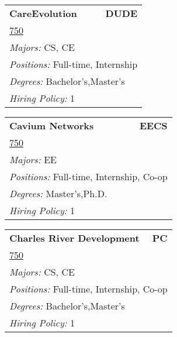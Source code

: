 \documentclass[twoside]{article}
\begin{document}
\begin{center}
\begin{multicols}{3}
\begin{FlushLeft}
\begin{minipage}{.9\columnwidth}
\end{minipage}
 
\begin{minipage}{.9\columnwidth}\begin{tabularx}{.95\columnwidth}{Xr}
                 {\Large\bf CareEvolution} & {\Large\bf DUDE}\\
    \multicolumn{2}{p{.95\columnwidth}}{\url{750}}\\
    \multicolumn{2}{p{.95\columnwidth}}{\emph{Majors:} CS, CE}\\
    \multicolumn{2}{p{.95\columnwidth}}{\emph{Positions:} Full-time, Internship}\\
    \multicolumn{2}{p{.95\columnwidth}}{\emph{Degrees:} Bachelor's,Master's}\\
    \multicolumn{2}{p{.95\columnwidth}}{\emph{Hiring Policy:} 1}\\
    \end{tabularx}
    
\end{minipage}
 
\begin{minipage}{.9\columnwidth}\begin{tabularx}{.95\columnwidth}{Xr}
                 {\Large\bf Cavium Networks} & {\Large\bf EECS}\\
    \multicolumn{2}{p{.95\columnwidth}}{\url{750}}\\
    \multicolumn{2}{p{.95\columnwidth}}{\emph{Majors:} EE}\\
    \multicolumn{2}{p{.95\columnwidth}}{\emph{Positions:} Full-time, Internship, Co-op}\\
    \multicolumn{2}{p{.95\columnwidth}}{\emph{Degrees:} Master's,Ph.D.}\\
    \multicolumn{2}{p{.95\columnwidth}}{\emph{Hiring Policy:} 1}\\
    \end{tabularx}
    
\end{minipage}
 
\begin{minipage}{.9\columnwidth}\begin{tabularx}{.95\columnwidth}{Xr}
                 {\Large\bf Charles River Development} & {\Large\bf PC}\\
    \multicolumn{2}{p{.95\columnwidth}}{\url{750}}\\
    \multicolumn{2}{p{.95\columnwidth}}{\emph{Majors:} CS, CE}\\
    \multicolumn{2}{p{.95\columnwidth}}{\emph{Positions:} Full-time, Internship, Co-op}\\
    \multicolumn{2}{p{.95\columnwidth}}{\emph{Degrees:} Bachelor's,Master's}\\
    \multicolumn{2}{p{.95\columnwidth}}{\emph{Hiring Policy:} 1}\\
    \end{tabularx}
    

\end{minipage}
\end{FlushLeft}
\end{multicols}
\end{center}
\end{document}
